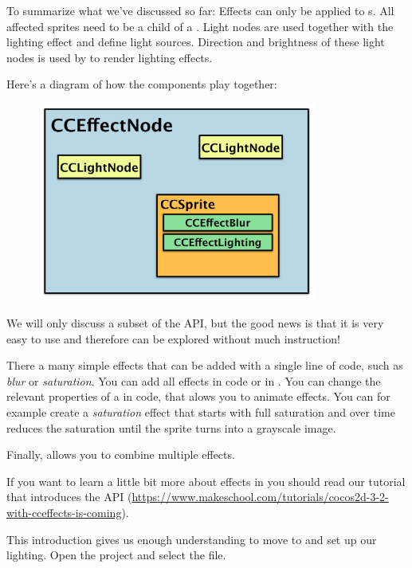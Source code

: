 To summarize what we've discussed so far: Effects can only be applied to
\ccsprite{}s. All affected sprites need to be a child of a
. Light nodes are used together with the lighting
effect and define light sources. Direction and brightness of these light nodes
is used by \cocos{} to render lighting effects.

Here's a diagram of how the components play together:

\begin{figure}[H]
    \centering
    \includegraphics[width=260pt]{images/Chapter9/effect_setup.png}
\end{figure}

We will only discuss a subset of the  API, but the good
news is that it is very easy to use and therefore can be explored without much
instruction! 

There a many simple effects that can be added with a single line of
code, such as \textit{blur} or \textit{saturation}. You can add all effects in
code or in \SB{}. You can change the relevant
properties of a  in code, that
alows you to animate effects. You can for example create
a \textit{saturation} effect that starts with full
saturation and over time reduces the saturation until
the sprite turns into a grayscale image.

Finally,  allows you to
combine multiple effects.

\begin{details}[frametitle={More on effects}]
If you want to learn a little bit more about effects in \cocos{} you should read
our tutorial that introduces the  
API (\url{https://www.makeschool.com/tutorials/cocos2d-3-2-with-cceffects-is-coming}).
\end{details}

This introduction gives us enough understanding to move to \SB{} and set up our
lighting. Open the \SB{} project and select the 
file.

